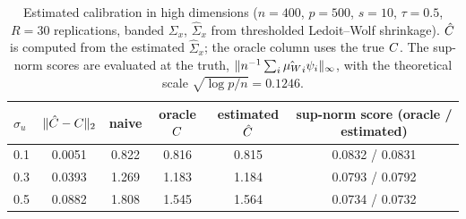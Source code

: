 \begin{table}[ht]
\centering
\footnotesize
\setlength{\tabcolsep}{3pt}
\caption{Estimated calibration in high dimensions ($n=400$, $p=500$, $s=10$, $\tau=0.5$, $R=30$ replications, banded $\Sigma_x$, $\hat\Sigma_x$ from thresholded Ledoit--Wolf shrinkage). $\hat{C}$ is computed from the estimated $\hat\Sigma_x$; the oracle column uses the true $C$. The sup-norm scores are evaluated at the truth, $\|n^{-1}\sum_i{\hat{\mu_W}}_i\psi_i\|_\infty$, with the theoretical scale $\sqrt{\log p/n} = 0.1246$.}
\label{tab:hdc}
\begin{tabular}{lccccc}
\toprule
$\sigma_u$ & $\|\hat{C}-C\|_2$ & naive & oracle $C$ & estimated $\hat{C}$ & sup-norm score (oracle / estimated) \\
\midrule
0.1 & 0.0051 & 0.822 & 0.816 & 0.815 & 0.0832 / 0.0831 \\
0.3 & 0.0393 & 1.269 & 1.183 & 1.184 & 0.0793 / 0.0792 \\
0.5 & 0.0882 & 1.808 & 1.545 & 1.564 & 0.0734 / 0.0732 \\
\bottomrule
\end{tabular}
\end{table}
